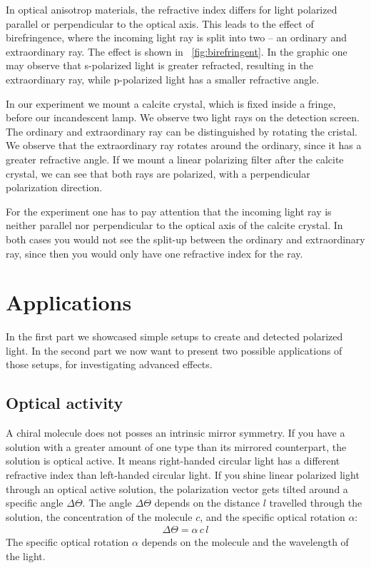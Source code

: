 \documentclass[a4paper,10pt,twocolumn]{article}
\begin{document}
    In optical anisotrop materials, the refractive index differs for light polarized
    parallel or perpendicular to the optical axis.
    This leads to the effect of birefringence, where the incoming light ray is split into 
    two -- an ordinary and extraordinary ray.
    The effect is shown in ~\autoref{fig:birefringent}.
    In the graphic one may observe that s-polarized light is greater refracted,
    resulting in the extraordinary ray,
    while p-polarized light has a smaller refractive angle.
    
    In our experiment we mount a calcite crystal, which is fixed inside a fringe,
    before our incandescent lamp. 
    We observe two light rays on the detection screen.
    The ordinary and extraordinary ray can be distinguished by rotating the cristal.
    We observe that the extraordinary ray rotates around the ordinary, since it has a 
    greater refractive angle.
    If we mount a linear polarizing filter after the calcite crystal, we can see that both rays are
    polarized, with a perpendicular polarization direction.
    
    For the experiment one has to pay attention that the incoming light ray is neither parallel nor
    perpendicular to the optical axis of the calcite crystal. 
    In both cases you would not see the split-up between the ordinary and extraordinary ray,
    since then you would only have one refractive index for the ray.
    
    \section{Applications}
    In the first part we showcased simple setups to create and detected polarized light.
    In the second part we now want to present two possible applications of those setups,
    for investigating advanced effects.
    \subsection{Optical activity}
    A chiral molecule does not posses an intrinsic mirror symmetry.
    If you have a solution with a greater amount of one type than its mirrored counterpart,
    the solution is optical active.
    It means right-handed circular light has a different refractive index than left-handed circular light.
    If you shine linear polarized light through an optical active solution, the
    polarization vector gets tilted around a specific angle $\Delta \Theta$.
    The angle $\Delta \Theta$ depends on the distance $l$ travelled through the solution,
    the concentration of the molecule $c$, and the specific optical rotation $\alpha$:
    \begin{align}
        \label{eq:specificOpticalRotation}
        \Delta \Theta = \alpha \, c \, l
    \end{align}
    The specific optical rotation $\alpha$ depends on the molecule and the wavelength of the light.
    
\end{document}
